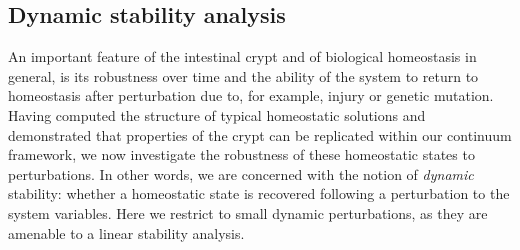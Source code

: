 %
%
%


\subsection{Dynamic stability analysis}
\label{sec:stability}
An important feature of the intestinal crypt and of biological homeostasis in general, is its robustness over time and the ability of the system to return to homeostasis after perturbation due to, for example, injury or genetic mutation. Having computed the structure of typical homeostatic solutions and demonstrated that properties of the crypt can be replicated within our continuum framework, we now investigate the robustness of these homeostatic states to perturbations. 
In other words, we are concerned with the notion of \emph{dynamic} stability: whether a homeostatic state is recovered following a perturbation to the system variables. Here we restrict to small dynamic perturbations, as they are amenable to a linear stability analysis. 

